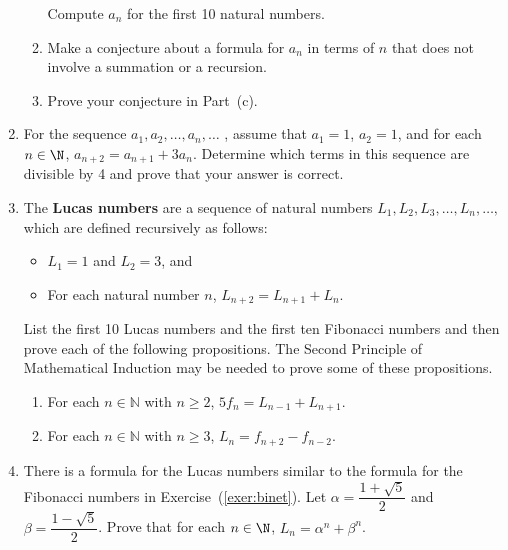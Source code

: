 \begin{enumerate}
\begin{enumerate}
\yitem Compute $a_n$ for the first 10 natural numbers.

\item Make a conjecture about a formula for $a_n$ in terms of $n$ that does not involve a summation or a recursion.

\item Prove your conjecture in Part~(c).
\end{enumerate}


\item For the sequence $a_1, a_2, \ldots, a_n, \ldots$ , assume that $a_1 = 1$, $a_2 = 1$, and for each $n \in \N$, $a_{n+2} = a_{n+1} + 3a_n$.  Determine which terms in this sequence are divisible by 4 and prove that your answer is correct.


\item The \textbf{Lucas numbers} \label{exer:lucasnumbers}
%
 are a sequence of natural numbers 
$L_1, L_2, L_3, \ldots, L_n, \ldots ,$ which are defined recursively as follows:

\begin{itemize}
\item $L_1 = 1$ and $L_2 = 3$, and
\item For each natural number $n$, $L_{n+2} = L_{n+1} + L_n$.
\end{itemize}

List the first 10 Lucas numbers and the first ten Fibonacci numbers and then prove each of the following propositions.  The Second Principle of Mathematical Induction may be needed to prove some of these propositions.

\begin{enumerate}
\yitem For each natural number $n$, $L_n = 2f_{n+1} - f_n$.

\item For each  $n \in \mathbb{N}$ with  $n \geq 2$,  $5f_n  = L_{n - 1}  + L_{n + 1} $.

\item For each  $n \in \mathbb{N}$ with  $n \geq 3$,  $L_n  = f_{n + 2}  - f_{n - 2} $.
\end{enumerate}



\item \label{exer:lucasnumbers2} There is a formula for the Lucas numbers similar to the formula for the Fibonacci numbers in 
Exercise~(\ref{exer:binet}).  Let $\alpha = \dfrac{1 + \sqrt{5}}{2}$ and 
\mbox{$\beta = \dfrac{1 - \sqrt{5}}{2}$}.  Prove that for each $n \in \N$, $L_n = \alpha^n + \beta^n$.




\end{enumerate}
